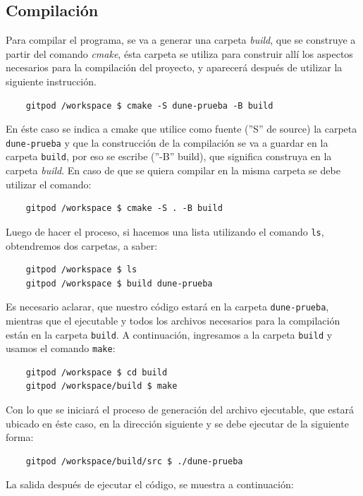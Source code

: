 \subsection{Compilación}
Para compilar el programa, se va a generar una carpeta \textit{build},
que se construye a partir del comando \textit{cmake}, ésta carpeta
se utiliza para construir allí los aspectos necesarios para la compilación del proyecto, y aparecerá después
de utilizar la siguiente instrucción.
\begin{verbatim}
	gitpod /workspace $ cmake -S dune-prueba -B build
\end{verbatim}
En éste caso se indica a cmake que utilice como fuente (''S'' de source) la carpeta \verb|dune-prueba| y
que la construcción de la compilación se va a guardar en la carpeta \verb|build|, por eso se escribe (''-B'' build),
que significa construya en la carpeta \textit{build}.
En caso de que se quiera compilar en la misma carpeta se debe utilizar el comando:
\begin{verbatim}
	gitpod /workspace $ cmake -S . -B build
\end{verbatim}
Luego de hacer el proceso, si hacemos una lista utilizando el comando \verb|ls|, obtendremos dos carpetas, a saber:
\begin{verbatim}
	gitpod /workspace $ ls
	gitpod /workspace $ build dune-prueba
\end{verbatim}
Es necesario aclarar, que nuestro código estará en la carpeta \verb|dune-prueba|, mientras que el ejecutable y
todos los archivos necesarios para la compilación están en la carpeta \verb|build|.  A continuación, ingresamos
a la carpeta \verb|build| y usamos el comando \verb|make|:
\begin{verbatim}
	gitpod /workspace $ cd build
	gitpod /workspace/build $ make
\end{verbatim}
Con lo que se iniciará el proceso de generación del archivo ejecutable, que estará ubicado en éste caso, en
la dirección siguiente y se debe ejecutar de la siguiente forma:
\begin{verbatim}
	gitpod /workspace/build/src $ ./dune-prueba
\end{verbatim}
La salida después de ejecutar el código, se muestra a continuación:
\begin{listing}[ht!]
	\inputminted{bash}{dune-learn-1.txt}
\end{listing}


